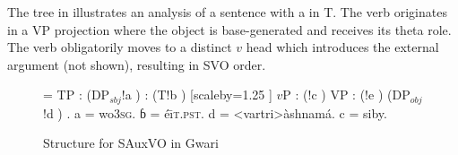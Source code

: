 \documentclass[output=paper,newtxmath,modfonts,nonflat,draftmode]{langsci/langscibook}
\begin{document}
The tree in  illustrates an analysis of a  sentence with a   in T. The verb originates in a VP projection where the object is base-generated and receives its theta role. The verb obligatorily moves to a distinct $v$ head which introduces the external argument (not shown), resulting in SVO order.

\begin{figure}
{\scriptsize \jtree[xunit=2.5em,yunit=1.25em]
\! = {TP}
: ({DP$_{sbj}$}!a ) 
: ({T}!b ) [scaleby=1.25 ] {$v$P}
: ({}!c ) {VP}
: ({}!e ) ({DP$_{obj}$}!d ) .
\!a = {wo}{\textsc{3sg}}.
ɓ = {{\texthtb{}é\=\i}}{\textsc{t.pst}}.
\!d = <vartri>{àshnamá}{}.
\!c = {si}{by}.
\endjtree}	

\caption{Structure for SAuxVO in Gwari}
\label{fig:sande:GwariVO}
\end{figure}

%
\end{document}
